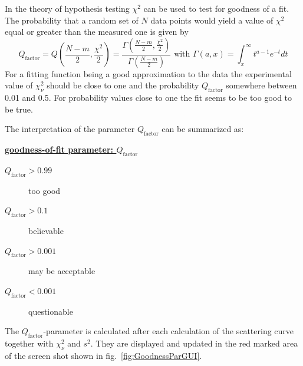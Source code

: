 In the theory of hypothesis testing $\chi^2$ can be used to test
for goodness of a fit. The probability that a random set of $N$ data points
would yield a value of $\chi^2$ equal or greater than the measured
one is given by
\begin{equation}
\displaystyle Q_\text{factor} =
Q\left(\frac{N-m}{2},\frac{\chi^2}{2}\right) =
\frac{\Gamma\left(\frac{N-m}{2},\frac{\chi^2}{2}\right)}{\Gamma\left(\frac{N-m}{2}\right)}
\text{ with } \Gamma\left(a,x\right) =  \int_x^\infty t^{a-1}e^{-t}
dt
\end{equation}
For a fitting function being a good approximation to the data the experimental
value of $\chi^2_\nu$ should be close to one and the probability
$Q_\text{factor}$ somewhere between 0.01 and 0.5. For probability values
close to one the fit seems to be too good to be true.

\vspace{5mm}

The interpretation of the parameter $Q_\text{factor}$ can be summarized as:

\vspace{5mm}

\underline{\bf goodness-of-fit parameter: $Q_\text{factor}$}
\begin{description}
 \item[$Q_\text{factor}>0.99$] too good
 \item[$Q_\text{factor}>0.1$] believable
 \item[$Q_\text{factor}>0.001$] may be acceptable
 \item[$Q_\text{factor}<0.001$] questionable
\end{description}

\vspace{5mm}

The $Q_\text{factor}$-parameter is calculated after each calculation of the scattering curve together with $\chi^2_\nu$ and $s^2$. They are displayed and updated in the red marked area of the screen shot shown in fig.\ \ref{fig:GoodnessParGUI}.

~\\
